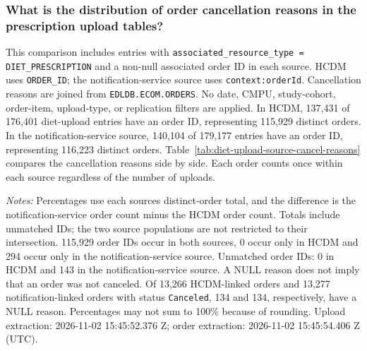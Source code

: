 \subsubsection{What is the distribution of order cancellation reasons in the prescription upload tables?}
\label{subsec:source-order-cancellation-reasons}
This comparison includes entries with \texttt{associated\_resource\_type = DIET\_PRESCRIPTION} and a non-null associated order ID in each source. HCDM uses \texttt{ORDER\_ID}; the notification-service source uses \texttt{context:orderId}. Cancellation reasons are joined from \texttt{EDLDB.ECOM.ORDERS}. No date, CMPU, study-cohort, order-item, upload-type, or replication filters are applied.
In HCDM, 137,431 of 176,401 diet-upload entries have an order ID, representing 115,929 distinct orders. In the notification-service source, 140,104 of 179,177 entries have an order ID, representing 116,223 distinct orders. Table~\ref{tab:diet-upload-source-cancel-reasons} compares the cancellation reasons side by side. Each order counts once within each source regardless of the number of uploads.


\noindent\textit{Notes:} Percentages use each source\textquotesingle s distinct-order total, and the difference is the notification-service order count minus the HCDM order count. Totals include unmatched IDs; the two source populations are not restricted to their intersection. 115,929 order IDs occur in both sources, 0 occur only in HCDM and 294 occur only in the notification-service source. Unmatched order IDs: 0 in HCDM and 143 in the notification-service source. A NULL reason does not imply that an order was not canceled. Of 13,266 HCDM-linked orders and 13,277 notification-linked orders with status \texttt{Canceled}, 134 and 134, respectively, have a NULL reason. Percentages may not sum to 100\% because of rounding. Upload extraction: 2026-11-02 15:45:52.376 Z; order extraction: 2026-11-02 15:45:54.406 Z (UTC).




